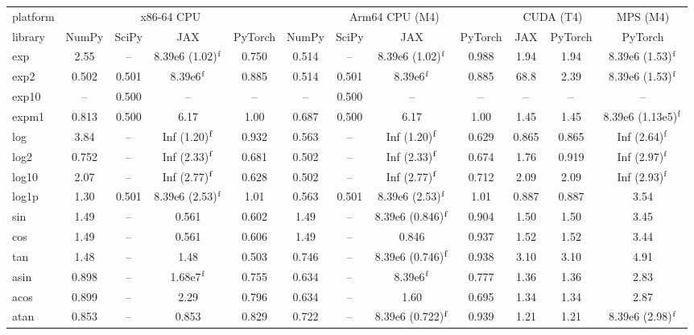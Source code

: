 \begin{table}
\centering
\begin{small}
\begin{tabular}{|l|cccc|cccc|cc|c|}
\hline
platform & \multicolumn{4}{c|}{x86-64 CPU} & \multicolumn{4}{c|}{Arm64 CPU (M4)} & \multicolumn{2}{c|}{CUDA (T4)} & \multicolumn{1}{c|}{MPS (M4)} \\
library & NumPy & SciPy & JAX & PyTorch & NumPy & SciPy & JAX & PyTorch & JAX & PyTorch & PyTorch \\ \hline
exp & 2.55 & -- & 8.39e6 (1.02)$^{\rm f}$ & 0.750 & 0.514 & -- & 8.39e6 (1.02)$^{\rm f}$ & 0.988 & 1.94 & 1.94 & 8.39e6 (1.53)$^{\rm f}$ \\
exp2 & 0.502 & 0.501 & 8.39e6$^{\rm f}$ & 0.885 & 0.514 & 0.501 & 8.39e6$^{\rm f}$ & 0.885 & 68.8 & 2.39 & 8.39e6 (1.53)$^{\rm f}$ \\
exp10 & -- & 0.500 & -- & -- & -- & 0.500 & -- & -- & -- & -- & -- \\
expm1 & 0.813 & 0.500 & 6.17 & 1.00 & 0.687 & 0.500 & 6.17 & 1.00 & 1.45 & 1.45 & 8.39e6 (1.13e5)$^{\rm f}$ \\
log & 3.84 & -- & Inf (1.20)$^{\rm f}$ & 0.932 & 0.563 & -- & Inf (1.20)$^{\rm f}$ & 0.629 & 0.865 & 0.865 & Inf (2.64)$^{\rm f}$ \\
log2 & 0.752 & -- & Inf (2.33)$^{\rm f}$ & 0.681 & 0.502 & -- & Inf (2.33)$^{\rm f}$ & 0.674 & 1.76 & 0.919 & Inf (2.97)$^{\rm f}$ \\
log10 & 2.07 & -- & Inf (2.77)$^{\rm f}$ & 0.628 & 0.502 & -- & Inf (2.77)$^{\rm f}$ & 0.712 & 2.09 & 2.09 & Inf (2.93)$^{\rm f}$ \\
log1p & 1.30 & 0.501 & 8.39e6 (2.53)$^{\rm f}$ & 1.01 & 0.563 & 0.501 & 8.39e6 (2.53)$^{\rm f}$ & 1.01 & 0.887 & 0.887 & 3.54 \\
sin & 1.49 & -- & 0.561 & 0.602 & 1.49 & -- & 8.39e6 (0.846)$^{\rm f}$ & 0.904 & 1.50 & 1.50 & 3.45 \\
cos & 1.49 & -- & 0.561 & 0.606 & 1.49 & -- & 0.846 & 0.937 & 1.52 & 1.52 & 3.44 \\
tan & 1.48 & -- & 1.48 & 0.503 & 0.746 & -- & 8.39e6 (0.746)$^{\rm f}$ & 0.938 & 3.10 & 3.10 & 4.91 \\
asin & 0.898 & -- & 1.68e7$^{\rm f}$ & 0.755 & 0.634 & -- & 8.39e6$^{\rm f}$ & 0.777 & 1.36 & 1.36 & 2.83 \\
acos & 0.899 & -- & 2.29 & 0.796 & 0.634 & -- & 1.60 & 0.695 & 1.34 & 1.34 & 2.87 \\
atan & 0.853 & -- & 0.853 & 0.829 & 0.722 & -- & 8.39e6 (0.722)$^{\rm f}$ & 0.939 & 1.21 & 1.21 & 8.39e6 (2.98)$^{\rm f}$ \\

\end{tabular}
\end{small}
\end{table}
